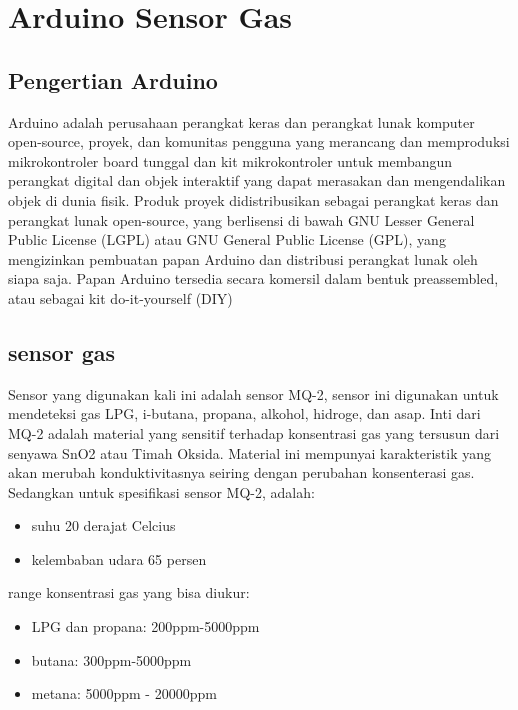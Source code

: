 \section{Arduino Sensor Gas}
\subsection{Pengertian Arduino}
Arduino adalah perusahaan perangkat keras dan perangkat lunak komputer open-source, proyek, dan komunitas pengguna yang merancang dan memproduksi mikrokontroler board tunggal dan kit mikrokontroler untuk membangun perangkat digital dan objek interaktif yang dapat merasakan dan mengendalikan objek di dunia fisik.
Produk proyek didistribusikan sebagai perangkat keras dan perangkat lunak open-source, yang berlisensi di bawah GNU Lesser General Public License (LGPL) atau GNU General Public License (GPL), yang mengizinkan pembuatan papan Arduino dan distribusi perangkat lunak oleh siapa saja. Papan Arduino tersedia secara komersil dalam bentuk preassembled, atau sebagai kit do-it-yourself (DIY)\cite{kushner2011making}
\subsection{sensor gas}
Sensor yang digunakan kali ini adalah sensor MQ-2, sensor ini digunakan untuk mendeteksi gas LPG, i-butana, propana, alkohol, hidroge, dan asap. Inti dari MQ-2 adalah material yang sensitif terhadap konsentrasi gas yang tersusun dari senyawa SnO2 atau Timah Oksida. Material ini mempunyai karakteristik yang akan merubah konduktivitasnya seiring dengan perubahan konsenterasi gas.
Sedangkan untuk spesifikasi sensor MQ-2, adalah:
\begin{itemize}
\item suhu 20 derajat Celcius
\item kelembaban udara 65 persen
\end{itemize}
range konsentrasi gas yang bisa diukur:
\begin{itemize}
\item LPG dan propana: 200ppm-5000ppm
\item butana: 300ppm-5000ppm
\item metana: 5000ppm - 20000ppm
\end{itemize}

